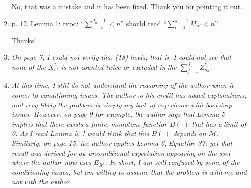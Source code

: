 \documentclass[12pt]{article}
\begin{document}
\begin{enumerate}
  No, that was a mistake and it has been fixed. Thank you for pointing
  it out.

\item p. 12, Lemma 1: typo: ``$\sum_{i=1}^{J_n-1} < n$'' should read
  ``$\sum_{i=1}^{J_n-1} M_{ni} < n$''.

  Thanks!

\item \textit{On page 7, I could not verify that (18) holds; that is,
    I could not see that none of the $X_{nt}^*$ is not counted twice
    or excluded in the $\sum_{j=1}^{J_n} Z_{nj}^*$.}

\item \textit{At this time, I still do not understand the reasoning of
    the author when it comes to conditioning issues. The author to his
    credit has added explanations, and very likely the problem is
    simply my lack of experience with bootstrap issues. However, on
    page 9 for example, the author says that Lemma 5 implies that
    there exists a finite, monotone function $B(\cdot)$ that has a
    limit of 0. As I read Lemma 5, I would think that this $B(\cdot)$
    depends on $\mathcal{M}$. Similarly, on page 15, the author
    applies Lemma 6, Equation 37; yet that result was derived for an
    unconditional expectation appearing on the spot where the author
    now uses $E_{\mathcal{M}}$. In short, I am still confused by some
    of the conditioning issues, but am willing to assume that the
    problem is with me and not with the author.}

\end{enumerate}
\end{document}
